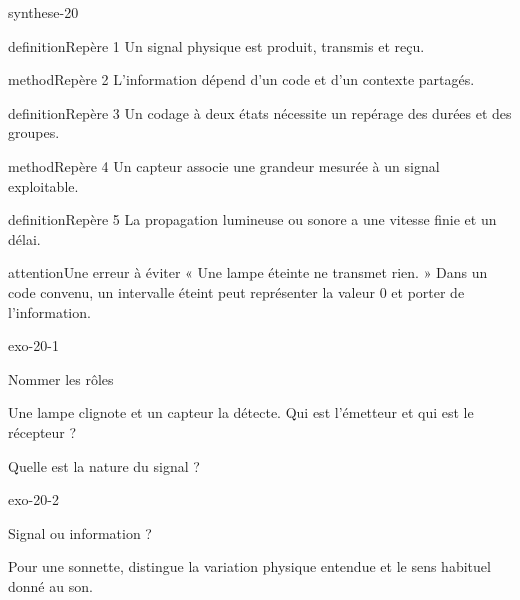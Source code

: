 \documentclass[12pt,twoside,openany]{book}
\begin{document}
\begin{pcFiche}{synthese-20}
\begin{pcEncadre}{definition}{Repère 1}
Un signal physique est produit, transmis et reçu.\par
\end{pcEncadre}
\begin{pcEncadre}{method}{Repère 2}
L’information dépend d’un code et d’un contexte partagés.\par
\end{pcEncadre}
\begin{pcEncadre}{definition}{Repère 3}
Un codage à deux états nécessite un repérage des durées et des groupes.\par
\end{pcEncadre}
\begin{pcEncadre}{method}{Repère 4}
Un capteur associe une grandeur mesurée à un signal exploitable.\par
\end{pcEncadre}
\begin{pcEncadre}{definition}{Repère 5}
La propagation lumineuse ou sonore a une vitesse finie et un délai.\par
\end{pcEncadre}
\begin{pcEncadre}{attention}{Une erreur à éviter}
« Une lampe éteinte ne transmet rien. » Dans un code convenu, un intervalle éteint peut représenter la valeur 0 et porter de l’information.\par
\end{pcEncadre}
\end{pcFiche}
\clearpage{}
\begin{blocLivre}{exo-20-1}
\begin{exercice}[1]{Nommer les rôles}
\begin{questions}
\item Une lampe clignote et un capteur la détecte. Qui est l’émetteur et qui est le récepteur ?
\item Quelle est la nature du signal ?
\end{questions}
\end{exercice}\end{blocLivre}
\begin{blocLivre}{exo-20-2}
\begin{exercice}[1]{Signal ou information ?}
\begin{questions}
\item Pour une sonnette, distingue la variation physique entendue et le sens habituel donné au son.
\end{questions}
\end{exercice}\end{blocLivre}
\end{document}
